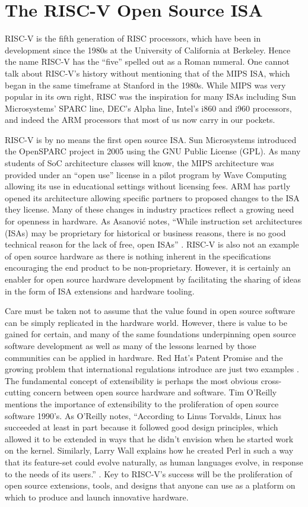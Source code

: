 \section{The RISC-V Open Source ISA}
RISC-V is the fifth generation of RISC processors, which have been in development since the 1980s at the University of California at Berkeley. Hence the name RISC-V has the ``five'' spelled out as a Roman numeral. One cannot talk about RISC-V's history without mentioning that of the MIPS ISA, which began in the same timeframe at Stanford in the 1980s. While MIPS was very popular in its own right, RISC was the inspiration for many ISAs including Sun Microsystems’ SPARC line, DEC’s Alpha line, Intel’s i860 and i960 processors, and indeed the ARM processors that most of us now carry in our pockets.

RISC-V is by no means the first open source ISA. Sun Microsystems introduced the OpenSPARC project in 2005 using the GNU Public License (GPL)\cite{anemaet2003microprocessor}. As many students of SoC architecture classes will know, the MIPS architecture was provided under an ``open use'' license in a pilot program by Wave Computing allowing its use in educational settings without licensing fees. ARM has partly opened its architecture allowing specific partners to proposed changes to the ISA they license. Many of these changes in industry practices reflect a growing need for openness in hardware. As Asanovi{\'c} notes, ``While instruction set architectures (ISAs) may be proprietary for historical or business reasons, there is no good technical reason for the lack of free, open ISAs'' \cite{asanovic2014instruction}. RISC-V is also not an example of open source hardware as there is nothing inherent in the specifications encouraging the end product to be non-proprietary. However, it is certainly an enabler for open source hardware development by facilitating the sharing of ideas in the form of ISA extensions and hardware tooling.

Care must be taken not to assume that the value found in open source software can be simply replicated in the hardware world. However, there is value to be gained for certain, and many of the same foundations underpinning open source software development as well as many of the lessons learned by those communities can be applied in hardware. Red Hat's Patent Promise and the growing problem that international regulations introduce are just two examples \cite{amye2021}. The fundamental concept of extensibility is perhaps the most obvious cross-cutting concern between open source hardware and software. Tim O'Reilly mentions the importance of extensibility to the proliferation of open source software 1990's. As O'Reilly notes, ``According to Linus Torvalds, Linux has succeeded at least in part because it followed good design principles, which allowed it to be extended in ways that he didn’t envision when he started work on the kernel. Similarly, Larry Wall explains how he created Perl in such a way that its feature-set could evolve naturally, as human languages evolve, in response to the needs of its users.'' \cite{o1999lessons}. Key to RISC-V's success will be the proliferation of open source extensions, tools, and designs that anyone can use as a platform on which to produce and launch innovative hardware.

